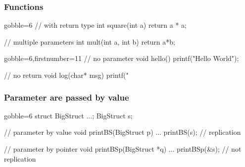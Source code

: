 \begin{frame}[fragile]
  \frametitle{Functions}
  \begin{multicols}{2}
    \begin{cppcode*}{gobble=6}
      // with return type
      int square(int a) {
        return a * a;
      }

      // multiple parameters
      int mult(int a,
               int b) {
        return a*b;
      }
    \end{cppcode*}
    \columnbreak
    \begin{cppcode*}{gobble=6,firstnumber=11}
      // no parameter
      void hello() {
        printf("Hello World");
      }

      // no return
      void log(char* msg) {
        printf("%
      }
    \end{cppcode*}
  \end{multicols}
\end{frame}

\begin{frame}[fragile]
  \frametitle{Parameter are passed by value}
  \begin{multicols}{2}
    \begin{cppcode*}{gobble=6}
      struct BigStruct {...};
      BigStruct s;
      
      // parameter by value
      void printBS(BigStruct p) {
        ...
      }
      printBS(s); // replication
      
      // parameter by pointer
      void printBSp(BigStruct *q) {
        ...
      }
      printBSp(&s); // not replication
    \end{cppcode*}
    \columnbreak
    \null \vfill
    \vfill \null
  \end{multicols}
\end{frame}


